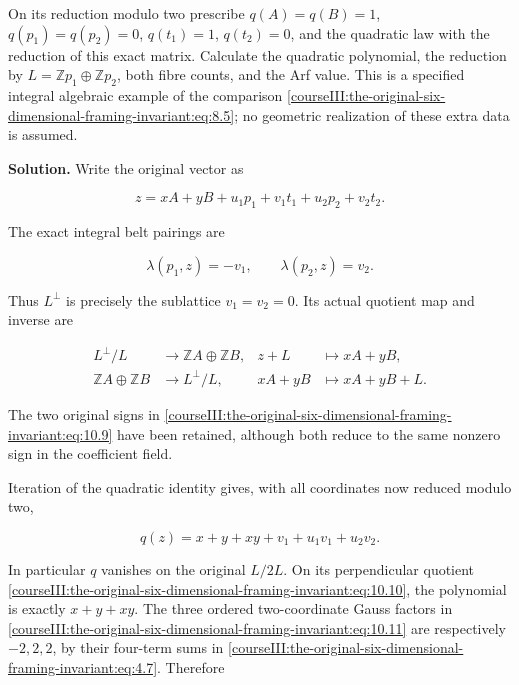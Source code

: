 On its reduction modulo two prescribe \(q(A)=q(B)=1\),
\(q(p_1)=q(p_2)=0\), \(q(t_1)=1\), \(q(t_2)=0\), and the quadratic law with the reduction of this exact matrix. Calculate the quadratic polynomial, the reduction by \(L=\mathbb Zp_1\oplus\mathbb Zp_2\), both fibre counts, and the Arf value. This is a specified integral algebraic example of the comparison \eqref{courseIII:the-original-six-dimensional-framing-invariant:eq:8.5}; no geometric realization of these extra data is assumed.

\textbf{Solution.} Write the original vector as

\begin{equation}
z=xA+yB+u_1p_1+v_1t_1+u_2p_2+v_2t_2.
 \label{courseIII:the-original-six-dimensional-framing-invariant:eq:10.8}
\end{equation}

The exact integral belt pairings are

\begin{equation}
\lambda(p_1,z)=-v_1,\qquad
                     \lambda(p_2,z)=v_2.
 \label{courseIII:the-original-six-dimensional-framing-invariant:eq:10.9}
\end{equation}

Thus \(L^\perp\) is precisely the sublattice \(v_1=v_2=0\). Its actual quotient map and inverse are

\begin{equation}
\begin{aligned}
  L^\perp/L&\longrightarrow\mathbb ZA\oplus\mathbb ZB,
       &z+L&\longmapsto xA+yB,\\
  \mathbb ZA\oplus\mathbb ZB&\longrightarrow L^\perp/L,
       &xA+yB&\longmapsto xA+yB+L.
 \end{aligned}
 \label{courseIII:the-original-six-dimensional-framing-invariant:eq:10.10}
\end{equation}

The two original signs in \eqref{courseIII:the-original-six-dimensional-framing-invariant:eq:10.9} have been retained, although both reduce to the same nonzero sign in the coefficient field.

Iteration of the quadratic identity gives, with all coordinates now reduced modulo two,

\begin{equation}
q(z)=x+y+xy+v_1+u_1v_1+u_2v_2.
 \label{courseIII:the-original-six-dimensional-framing-invariant:eq:10.11}
\end{equation}

In particular \(q\) vanishes on the original \(L/2L\). On its perpendicular quotient \eqref{courseIII:the-original-six-dimensional-framing-invariant:eq:10.10}, the polynomial is exactly \(x+y+xy\). The three ordered two-coordinate Gauss factors in \eqref{courseIII:the-original-six-dimensional-framing-invariant:eq:10.11} are respectively \(-2,2,2\), by their four-term sums in \eqref{courseIII:the-original-six-dimensional-framing-invariant:eq:4.7}. Therefore

